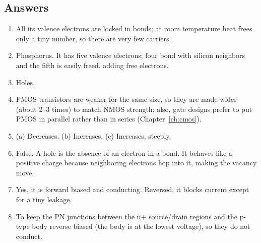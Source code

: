\subsection*{Answers}
\begin{enumerate}
  \item All its valence electrons are locked in bonds; at room temperature heat frees only a tiny number, so there are very few carriers.
  \item Phosphorus. It has five valence electrons; four bond with silicon neighbors and the fifth is easily freed, adding free electrons.
  \item Holes.
  \item PMOS transistors are weaker for the same size, so they are made wider (about 2--3 times) to match NMOS strength; also, gate designs prefer to put PMOS in parallel rather than in series (Chapter~\ref{ch:cmos}).
  \item (a) Decreases. (b) Increases. (c) Increases, steeply.
  \item False. A hole is the absence of an electron in a bond. It behaves like a positive charge because neighboring electrons hop into it, making the vacancy move.
  \item Yes, it is forward biased and conducting. Reversed, it blocks current except for a tiny leakage.
  \item To keep the PN junctions between the n+ source/drain regions and the p-type body reverse biased (the body is at the lowest voltage), so they do not conduct.
\end{enumerate}
